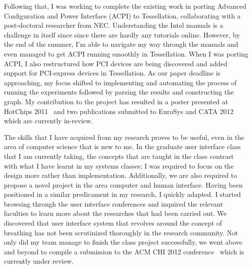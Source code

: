 \documentclass[11pt]{article}
\begin{document}
Following that, I was working to complete the existing work in porting Advanced Configuration and Power Interface (ACPI) to Tessellation, collaborating with a post-doctoral researcher from NEC. Understanding the Intel manuals is a challenge in itself since since there are hardly any tutorials online. However, by the end of the summer, I'm able to navigate my way through the manuals and even managed to get ACPI running smoothly in Tessellation. When I was porting ACPI, I also restructured how PCI devices are being discovered and added support for PCI-express devices in Tessellation. As our paper deadline is approaching, my focus shifted to implementing and automating the process of running the experiments followed by parsing the results and constructing the graph. My contribution to the project has resulted in a poster presented at HotChips 2011~\cite{tess_hotchip} and two publications submitted to EuroSys and CATA 2012~\cite{tess_eurosys, tess_cata} which are currently in-review. \newline

The skills that I have acquired from my research proves to be useful, even in the area of computer science that is new to me. In the graduate user interface class that I am currently taking, the concepts that are taught in the class contrast with what I have learnt in my systems classes; I was required to focus on the design more rather than implementation. Additionally, we are also required to propose a novel project in the area computer and human interface. Having been positioned in a similar predicament in my research, I quickly adapted. I started browsing through the user interface conferences and inquired the relevant faculties to learn more about the researches that had been carried out. We discovered that user interface system that revolves around the concept of breathing has not been scrutinized thoroughly in the research community. Not only did my team manage to finish the class project successfully, we went above and beyond to compile a submission to the ACM CHI 2012 conference~\cite{tube_chi} which is currently under review. \newline

\end{document}

